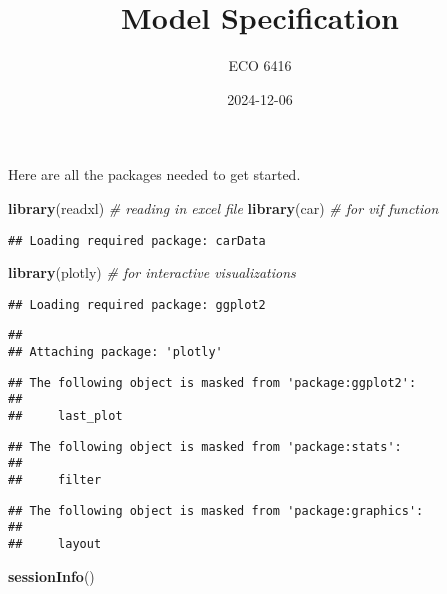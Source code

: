 \documentclass[
]{article}
\title{Model Specification}
\author{ECO 6416}
\date{2024-12-06}
\newenvironment{Shaded}{\begin{snugshade}}{\end{snugshade}}
\newcommand{\CommentTok}[1]{\textcolor[rgb]{0.56,0.35,0.01}{\textit{#1}}}
\newcommand{\FunctionTok}[1]{\textcolor[rgb]{0.13,0.29,0.53}{\textbf{#1}}}
\newcommand{\NormalTok}[1]{#1}
\begin{document}
\maketitle

{
\setcounter{tocdepth}{2}
\tableofcontents
}
Here are all the packages needed to get started.

\begin{Shaded}
\begin{Highlighting}[]
\FunctionTok{library}\NormalTok{(readxl) }\CommentTok{\# reading in excel file}
\FunctionTok{library}\NormalTok{(car) }\CommentTok{\# for vif function}
\end{Highlighting}
\end{Shaded}

\begin{verbatim}
## Loading required package: carData
\end{verbatim}

\begin{Shaded}
\begin{Highlighting}[]
\FunctionTok{library}\NormalTok{(plotly) }\CommentTok{\# for interactive visualizations}
\end{Highlighting}
\end{Shaded}

\begin{verbatim}
## Loading required package: ggplot2
\end{verbatim}

\begin{verbatim}
## 
## Attaching package: 'plotly'
\end{verbatim}

\begin{verbatim}
## The following object is masked from 'package:ggplot2':
## 
##     last_plot
\end{verbatim}

\begin{verbatim}
## The following object is masked from 'package:stats':
## 
##     filter
\end{verbatim}

\begin{verbatim}
## The following object is masked from 'package:graphics':
## 
##     layout
\end{verbatim}

\begin{Shaded}
\begin{Highlighting}[]
\FunctionTok{sessionInfo}\NormalTok{()}
\end{Highlighting}
\end{Shaded}
\end{document}

